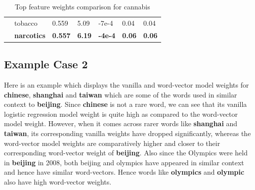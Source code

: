 \begin{table}[htbp]
\begin{tabular}{lllllll}
\multicolumn{1}{l|}{} & \multicolumn{1}{l|}{tobacco} & \multicolumn{1}{l|}{0.559} & \multicolumn{1}{l|}{5.09} & \multicolumn{1}{l|}{-7e-4} & \multicolumn{1}{l|}{0.04} & 0.04 \\
\multicolumn{1}{l|}{\textbf{}} & \multicolumn{1}{l|}{\textbf{narcotics}} & \multicolumn{1}{l|}{\textbf{0.557}} & \multicolumn{1}{l|}{\textbf{6.19}} & \multicolumn{1}{l|}{\textbf{-4e-4}} & \multicolumn{1}{l|}{\textbf{0.06}} & \textbf{0.06}
\end{tabular}
\caption{\label{tab:widgets}Top feature weights comparison for cannabis}
\end{table}

\subsection{Example Case 2}

Here is an example which displays the vanilla and word-vector model weights for \textbf{chinese}, \textbf{shanghai} and \textbf{taiwan} which are some of the words used in similar context to \textbf{beijing}. Since \textbf{chinese} is not a rare word, we can see that its vanilla logistic regression model weight is quite high as compared to the word-vector model weight. However, when it comes across rarer words like \textbf{shanghai} and \textbf{taiwan}, its corresponding vanilla weights have dropped significantly, whereas the word-vector model weights are comparatively higher and closer to their corresponding word-vector weight of \textbf{beijing}. Also since the Olympics were held in \textbf{beijing} in 2008, both beijing and olympics have appeared in similar context and hence have similar word-vectors. Hence words like \textbf{olympics} and \textbf{olympic} also have high word-vector weights.

